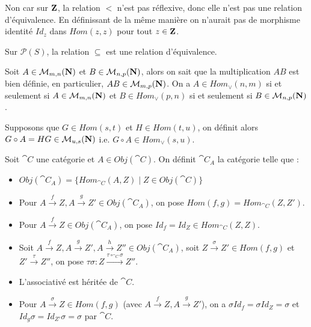 \begin{exercice}
    Non car sur $\mathbf{Z}$, la relation $<$ n'est pas réflexive, donc elle n'est pas une relation d'équivalence.
    En définissant de la même manière on n'aurait pas de morphisme identité $Id_z$ dans $Hom(z,z)$ pour tout $z \in \mathbf{Z}$.
\end{exercice}

\begin{exercice}
    Sur $\mathcal{P}(S)$, la relation $\subseteq$ est une relation d'équivalence.
\end{exercice}

\begin{exercice}
    Soit $A \in \mathcal{M}_{m,n}(\mathbf{N})$ et $B \in \mathcal{M}_{n,p}(\mathbf{N})$, alors on sait que la multiplication $AB$ est bien 
    définie, en particulier, $AB \in \mathcal{M}_{m,p}(\mathbf{N})$. On a $A \in Hom_\vee(n,m)$ si et seulement si $A \in \mathcal{M}_{m,n}(\mathbf{N})$
    et $B \in Hom_\vee(p,n)$ si et seulement si $B \in \mathcal{M}_{n,p}(\mathbf{N})$.
    
    Supposons que $G \in Hom(s,t)$ et $H \in Hom(t,u)$, on définit alors $G \circ A = HG \in \mathcal{M}_{u,s}(\mathbf{N})$ i.e. $G \circ A \in Hom_\vee(s,u)$.
\end{exercice}

\begin{exercice}
    Soit $\cat{C}$ une catégorie et $A \in Obj(\cat{C})$. On définit $\cat{C}_A$ la catégorie telle que :
    \begin{itemize}
        \item $Obj(\cat{C}_A) = \{Hom_{\cat{C}}(A,Z) \mid Z \in Obj(\cat{C})\}$
        \item Pour $A \xrightarrow{f} Z, A \xrightarrow{g} Z' \in Obj(\cat{C}_A)$,
        on pose $Hom(f,g) = Hom_{\cat{C}}(Z,Z')$.
        \item Pour $A \xrightarrow{f} Z \in Obj(\cat{C}_A)$, on pose $Id_f = Id_Z \in Hom_{\cat{C}}(Z,Z)$.
        \item Soit $A \xrightarrow{f} Z, A \xrightarrow{g} Z',A \xrightarrow{h} Z'' \in Obj(\cat{C}_A)$, soit $Z \xrightarrow{\sigma} Z'\in Hom(f,g)$ et 
        $Z' \xrightarrow{\tau} Z''$, on pose $\tau \sigma : Z \xrightarrow{\tau \circ_{\cat{C}} \sigma} Z''$.
        \item L'associativé est héritée de $\cat{C}$.
        \item Pour $A \xrightarrow{\sigma} Z \in Hom(f,g)$ (avec $A \xrightarrow{f} Z, A \xrightarrow{g} Z'$), on a $\sigma Id_f = \sigma Id_Z = \sigma$ et
        $Id_g \sigma = Id_{Z'} \sigma = \sigma$ par $\cat{C}$.
    \end{itemize}
\end{exercice}

\begin{exercice}
    
\end{exercice}